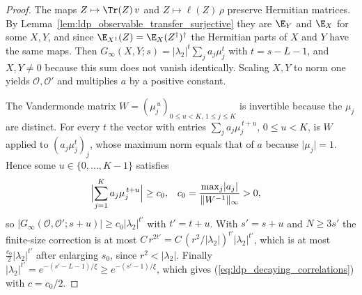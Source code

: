 \begin{proof}
    The maps $Z\mapsto\Tr(Z)\,v$ and $Z\mapsto\ell(Z)\,\rho$ preserve
    Hermitian matrices. By Lemma~\ref{lem:ldp_observable_transfer_surjective}
    they are $\E_Y$ and $\E_X$ for some $X,Y$, and since
    $\E_{X^\dagger}(Z)=\E_X(Z^\dagger)^\dagger$ the Hermitian parts of $X$ and
    $Y$ have the same maps. Then
    $G_\infty(X,Y;s)=\lvert\lambda_2\rvert^t\sum_ja_j\mu_j^t$ with $t=s-L-1$,
    and $X,Y\neq0$ because this sum does not vanish identically. Scaling
    $X,Y$ to norm one yields $\mathcal O,\mathcal O'$ and multiplies
    $a$ by a positive constant.

    The Vandermonde matrix $W=(\mu_j^{\,u})_{0\le u<K,\,1\le j\le K}$ is
    invertible because the $\mu_j$ are distinct. For every $t$ the vector with
    entries $\sum_ja_j\mu_j^{\,t+u}$, $0\le u<K$, is $W$ applied to
    $(a_j\mu_j^t)_j$, whose maximum norm equals that of $a$ because
    $\lvert\mu_j\rvert=1$. Hence some $u\in\{0,\dots,K-1\}$ satisfies
    \begin{align}
        \Bigl\lvert\sum_{j=1}^Ka_j\mu_j^{\,t+u}\Bigr\rvert
         & \ge c_0,
         &
        c_0
         & =\frac{\max_j\lvert a_j\rvert}{\lVert W^{-1}\rVert_\infty}>0,
        \label{eq:ldp_vandermonde_window}
    \end{align}
    so $\lvert G_\infty(\mathcal O,\mathcal O';s+u)\rvert\ge
        c_0\lvert\lambda_2\rvert^{t'}$ with $t'=t+u$. With $s'=s+u$ and
    $N\ge3s'$ the finite-size correction is at most
    $C\,r^{2t'}=C\,(r^2/\lvert\lambda_2\rvert)^{t'}\lvert\lambda_2\rvert^{t'}$,
    which is at most $\tfrac{c_0}{2}\lvert\lambda_2\rvert^{t'}$ after
    enlarging $s_0$, since $r^2<\lvert\lambda_2\rvert$. Finally
    $\lvert\lambda_2\rvert^{t'}=e^{-(s'-L-1)/\xi}\ge e^{-(s'-1)/\xi}$, which
    gives (\ref{eq:ldp_decaying_correlations}) with $c=c_0/2$.
\end{proof}
